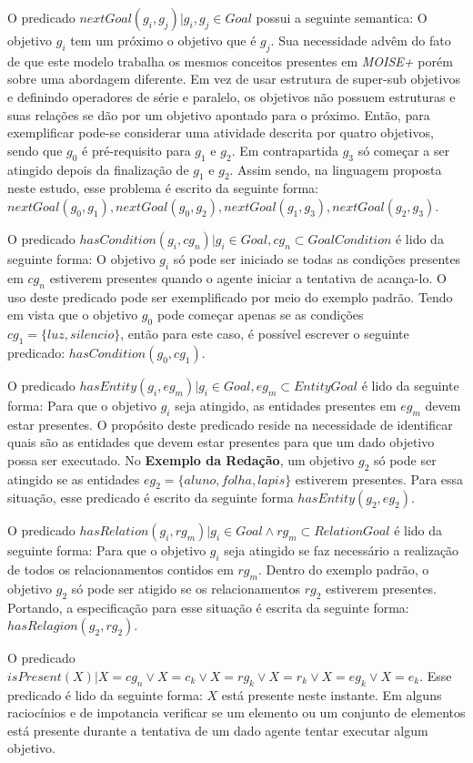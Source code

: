 O predicado $nextGoal(g_i,g_j) |g_i, g_j \in Goal$ possui a seguinte semantica: O objetivo $g_i$ tem um próximo o objetivo que 
é $g_j$. Sua necessidade advêm do fato de que este modelo trabalha os mesmos conceitos presentes em \textit{MOISE+} porém sobre
uma abordagem diferente. Em vez de usar estrutura de super-sub objetivos e definindo operadores de série e paralelo, os objetivos 
não possuem estruturas e suas relações se dão por um objetivo apontado para o próximo. Então, para exemplificar pode-se 
considerar uma atividade descrita por quatro objetivos, sendo que $g_0$ é pré-requisito para $g_1$ e $g_2$. Em contrapartida
$g_3$ só começar a ser atingido depois da finalização de $g_1$ e $g_2$. Assim sendo, na linguagem proposta neste estudo, 
esse problema é escrito da seguinte forma: $nextGoal(g_0,g_1), nextGoal(g_0,g_2), nextGoal(g_1,g_3), nextGoal(g_2,g_3)$.

O predicado $hasCondition(g_i,cg_n) | g_i \in Goal, cg_n \subset GoalCondition$ é lido da seguinte forma: O objetivo $g_i$ só pode 
ser iniciado se todas as condições presentes em $cg_n$ estiverem presentes quando o agente iniciar a tentativa de acança-lo. 
O uso deste predicado pode ser exemplificado por meio do exemplo padrão. Tendo em vista que o objetivo $g_0$ pode começar apenas 
se as condições $cg_1 = \{ luz, silencio \}$, então para este caso, é possível escrever o seguinte predicado: $hasCondition(g_0,cg_1)$.

O predicado $hasEntity(g_i,eg_m) | g_i \in Goal, eg_m \subset EntityGoal $ é lido da seguinte forma: Para que o objetivo $g_i$ seja atingido, as entidades presentes em 
$eg_m$ devem estar presentes. O propósito deste predicado reside na necessidade de identificar quais são as entidades que devem 
estar presentes para que um dado objetivo possa ser executado. No \textbf{Exemplo da Redação}, um objetivo $g_2$ só pode ser 
atingido se as entidades $eg_2 = \{ aluno, folha, lapis\}$ estiverem presentes. Para essa situação, esse predicado é escrito da 
seguinte forma $hasEntity(g_2,eg_2)$.

O predicado $hasRelation(g_i,rg_m) | g_i \in Goal \wedge rg_m \subset RelationGoal $ é lido da seguinte forma: Para que o objetivo $g_i$
seja atingido se faz necessário a realização de todos os relacionamentos contidos em $rg_m$. Dentro do exemplo padrão, o objetivo 
$g_2$ só pode ser atigido se os relacionamentos $rg_2$ estiverem presentes. Portando, a especificação para esse situação é escrita
da seguinte forma: $hasRelagion(g_2,rg_2)$.

O predicado $isPresent(X) | X = cg_n \vee X = c_k \vee  X = rg_k \vee X = r_k \vee X = eg_k \vee X = e_k $. Esse predicado é lido 
da seguinte forma: $X$ está presente neste instante. Em alguns raciocínios e de impotancia verificar se um elemento ou um conjunto
de elementos está presente durante a tentativa de um dado agente tentar executar algum objetivo.

